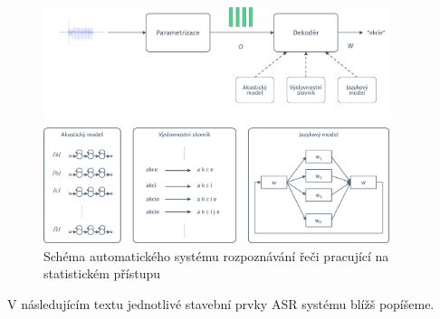 \begin{figure}[hbpt]
  \centering
  \includegraphics[width=0.9\textwidth]{./ch4-asr/img/decoding.pdf}
  \caption{Schéma automatického systému rozpoznávání řeči pracující na statistickém přístupu}
  \label{fig:asr:decoding}
\end{figure}

V následujícím textu jednotlivé stavební prvky ASR systému blížš popíšeme.










